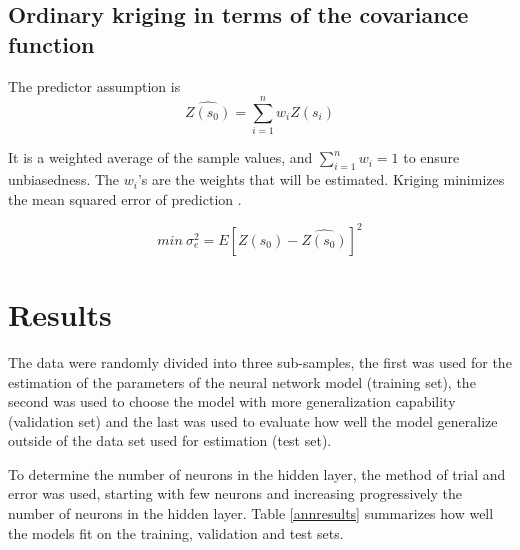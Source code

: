 \documentclass[11pt,twoside]{rmta2010esp}%
\begin{document}
\subsection*{Ordinary kriging in terms of the covariance function}
The predictor assumption is 
\begin{equation}
\hat{Z(s_{0})} = \sum_{i=1}^{n} w_{i}Z(s_{i})
\end{equation}

It is a weighted average of the sample values, and $ \sum_{i=1}^{n} w_{i} = 1 $ to ensure unbiasedness. The $w_{i}$'s are the weights that will be estimated. Kriging minimizes the mean squared error of prediction \cite{nicolas2015}. 

\begin{equation}
min \ \sigma_{e}^{2} = E\left[Z(s_{0}) - \hat{Z(s_{0})}\right]^{2}
\end{equation}  



\section{Results}
The data were randomly divided into three sub-samples, the first was used for the
estimation of the parameters of the neural network model (training set), the second was used to choose the model with more generalization capability (validation set) and the last was
used to evaluate how well the model generalize outside of the data set used for estimation (test set). 

To determine the number of neurons in the hidden layer, the method of trial and error was used, starting with few neurons and increasing progressively the number of neurons in the hidden layer. Table \ref{annresults}
summarizes how well the models fit on the training, validation and test sets.
\end{document}
